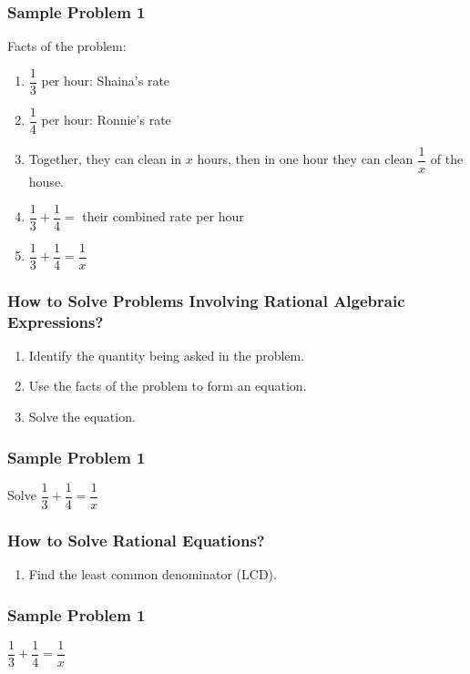 \documentclass[14pt]{beamer}
\begin{document}
    \begin{frame}
    	\frametitle{Sample Problem 1}
    	Facts of the problem:
    	\begin{enumerate}
    		\item<1->  $ \dfrac{1}{3} $ per hour: Shaina's rate
    		\item<2->  $ \dfrac{1}{4} $ per hour: Ronnie's rate
    		\item<3-> Together, they can clean in $ x $ hours, then in one hour they can clean $ \dfrac{1}{x} $ of the house.
    		\item<4-> $ \dfrac{1}{3} + \dfrac{1}{4} = $ their combined rate per hour
    		\item<5->[Then,] $ \dfrac{1}{3} + \dfrac{1}{4} = \dfrac{1}{x}$
    	\end{enumerate}
    \end{frame}

    \begin{frame}
    	\frametitle{How to Solve Problems Involving Rational Algebraic Expressions?}
    	\begin{enumerate}
    		\item Identify the quantity being asked in the problem.
    		\item Use the facts of the problem to form an equation.
    		\item Solve the equation.
    	\end{enumerate}
    \end{frame}

    \begin{frame}
    	\frametitle{Sample Problem 1}
    	Solve $ \dfrac{1}{3} + \dfrac{1}{4} = \dfrac{1}{x}$
    \end{frame}

   \begin{frame}
   	\frametitle{How to Solve Rational Equations?}
   	\begin{enumerate}
   		\item Find the least common denominator (LCD).
   	\end{enumerate}
   \end{frame}

    \begin{frame}
    	\frametitle{Sample Problem 1}
    	$ \dfrac{1}{3} + \dfrac{1}{4} = \dfrac{1}{x}$
    	
    \end{frame}
    
\end{document}
